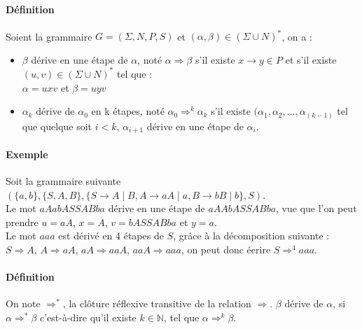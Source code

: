

\paragraph{Définition} %
\label{par:d_finition}

Soient la grammaire $G = (\Sigma,N,P,S)$ et $(\alpha,\beta) \in (\Sigma \cup N)^*$, on a :

\begin{itemize}
	\item $\beta$ dérive en une étape de $\alpha$, noté $\alpha \Rightarrow \beta$ s'il existe $x \rightarrow y \in P$ et s'il existe $(u,v) \in (\Sigma \cup N)^*$ tel que :\\
	$\alpha = uxv$ et $\beta = uyv$

	\item $\alpha_k$ dérive de $\alpha_0$ en k étapes, noté $\alpha_0 \Rightarrow^k \alpha_k$ s'il existe $(\alpha_1,\alpha_2,...,\alpha_(k-1)$ tel que quelque soit $i < k$, $\alpha_{i+1}$ dérive en une étape de $\alpha_i$.
\end{itemize}



\paragraph{Exemple} %
\label{par:exemple}

Soit la grammaire suivante $(\{a,b\},\{S,A,B\},\{S \rightarrow A \mid B, A\rightarrow aA \mid a, B \rightarrow bB\mid b\},S)$.\\
Le mot $aAabASSABba$ dérive en une étape de $aAAbASSABba$, vue que l'on peut prendre $u=aA$, $x=A$, $v=bASSABba$ et $y=a$.\\
Le mot $aaa$ est dérivé en 4 étapes de $S$, grâce à la décomposition suivante :\\
$S \Rightarrow A$, $A \Rightarrow aA$, $aA \Rightarrow aaA$, $aaA \Rightarrow aaa$, on peut donc écrire $S \Rightarrow^4 aaa$.



\paragraph{Définition} %
\label{par:d_finition}

On note $\Rightarrow^*$, la clôture réflexive transitive de la relation $\Rightarrow$. $\beta$ dérive de $\alpha$, si $\alpha \Rightarrow^* \beta$ c'est-à-dire qu'il existe $k \in \mathbb{N}$, tel que $\alpha \Rightarrow^k \beta$.

